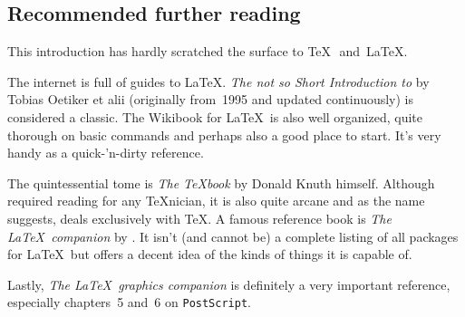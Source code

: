 \documentclass[a4paper,justified]{tufte-handout}
\begin{document}
\subsection{\hspace*{-8pt}Recommended further reading}\label{furtherreading}
This introduction has hardly scratched the surface to \TeX\ \,and \,\LaTeX.

The internet is full of guides to \LaTeX . \textit{The not so Short Introduction to \LaTeXe} by Tobias Oetiker et alii (originally from~1995 and updated continuously)\nocite{oetiker2014} is considered a classic. The Wikibook for \LaTeX\ is also well organized, quite thorough on basic commands and perhaps also a good place to start.  It's very handy as a quick-\kern-1pt'n-dirty reference.

The quintessential tome is \textit{The \TeX book} by Donald Knuth himself. Although required reading for any \TeX nician, it is also quite arcane and as the name suggests, deals exclusively with \TeX. A famous reference book is \textit{The \LaTeX\ companion} by \citet{mittelbach2004}. It isn't (and cannot be) a complete listing of all packages for \LaTeX\ but offers a decent idea of the kinds of things it is capable of.

Lastly, \textit{The \LaTeX\ graphics companion} \citet{goossens2008} is definitely a very important reference, especially chapters~5 and~6 on \texttt{PostScript}.
\vspace*{2cm}

\bgroup
{}

\egroup



\small
\begin{fullwidth}
\printindex
\end{fullwidth}
\end{document}
